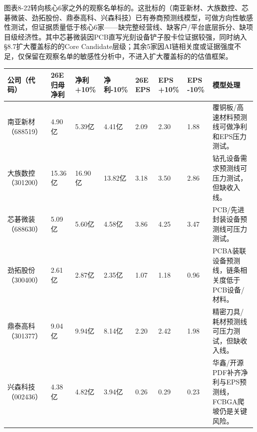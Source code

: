 图表8-22转向核心6家之外的观察名单标的。这批标的（南亚新材、大族数控、芯碁微装、劲拓股份、鼎泰高科、兴森科技）已有券商预测线模型，可做方向性敏感性测试，但证据质量低于核心6家——缺完整经营线、缺客户/平台底层拆分、缺项目级经济性。其中芯碁微装因PCB直写光刻设备铲子股卡位证据较强，同时纳入§8.7扩大覆盖标的的Core Candidate层级；其余5家因AI链相关度或证据强度不足，仅保留在观察名单的敏感性分析中，不进入扩大覆盖标的的估值框架。

\begin{exhibitbox}[图表8-22：观察名单预测线EPS压力测试]
\footnotesize
\begin{tabularx}{\textwidth}{L{1.7cm}R{1.6cm}R{1.6cm}R{1.6cm}R{1.3cm}R{1.3cm}R{1.3cm}X}
\toprule
\textbf{公司（代码）} & \textbf{26E归母净利} & \textbf{净利+10\%} & \textbf{净利-10\%} & \textbf{26E EPS} & \textbf{EPS +10\%} & \textbf{EPS -10\%} & \textbf{模型处理} \\
\midrule
南亚新材（688519） & 4.90亿 & 5.39亿 & 4.41亿 & 2.09 & 2.30 & 1.88 & 覆铜板/高速材料预测线可做净利和EPS压力测试。 \\
大族数控（301200） & 15.36亿 & 16.90亿 & 13.82亿 & 3.18 & 3.50 & 2.86 & 钻孔设备需求预测线可压力测试，但缺收入线。 \\
芯碁微装（688630） & 5.09亿 & 5.60亿 & 4.58亿 & 3.86 & 4.25 & 3.47 & PCB/先进封装设备预测线可压力测试。 \\
劲拓股份（300400） & 2.61亿 & 2.87亿 & 2.35亿 & 1.07 & 1.18 & 0.96 & PCBA装联设备预测线，链条相关度低于PCB设备/材料。 \\
鼎泰高科（301377） & 9.04亿 & 9.94亿 & 8.14亿 & 2.20 & 2.42 & 1.98 & 精密刀具/耗材预测线可压力测试，但缺收入线。 \\
兴森科技（002436） & 4.38亿 & 4.82亿 & 3.94亿 & 0.26 & 0.29 & 0.23 & 华鑫/开源PDF补齐净利与EPS预测线，FCBGA爬坡仍是关键风险。 \\
\bottomrule
\end{tabularx}
\end{exhibitbox}

